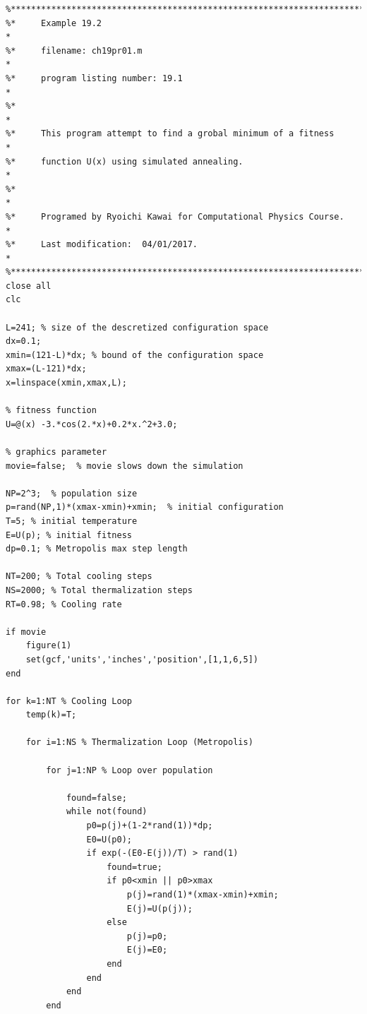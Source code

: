\noindent
\program
\label{prog:sa}
\footnotesize
\begin{verbatim}
%**************************************************************************
%*     Example 19.2                                                       *
%*     filename: ch19pr01.m                                               *
%*     program listing number: 19.1                                       *
%*                                                                        *
%*     This program attempt to find a grobal minimum of a fitness         *
%*     function U(x) using simulated annealing.                                         *
%*                                                                        *
%*     Programed by Ryoichi Kawai for Computational Physics Course.       *
%*     Last modification:  04/01/2017.                                    *
%**************************************************************************
close all
clc

L=241; % size of the descretized configuration space
dx=0.1;
xmin=(121-L)*dx; % bound of the configuration space
xmax=(L-121)*dx;
x=linspace(xmin,xmax,L);

% fitness function
U=@(x) -3.*cos(2.*x)+0.2*x.^2+3.0;

% graphics parameter
movie=false;  % movie slows down the simulation

NP=2^3;  % population size
p=rand(NP,1)*(xmax-xmin)+xmin;  % initial configuration
T=5; % initial temperature
E=U(p); % initial fitness
dp=0.1; % Metropolis max step length

NT=200; % Total cooling steps
NS=2000; % Total thermalization steps
RT=0.98; % Cooling rate

if movie
    figure(1)
    set(gcf,'units','inches','position',[1,1,6,5])
end

for k=1:NT % Cooling Loop
    temp(k)=T;

    for i=1:NS % Thermalization Loop (Metropolis)
        
        for j=1:NP % Loop over population

            found=false;
            while not(found)
                p0=p(j)+(1-2*rand(1))*dp;
                E0=U(p0);
                if exp(-(E0-E(j))/T) > rand(1)
                    found=true;
                    if p0<xmin || p0>xmax
                        p(j)=rand(1)*(xmax-xmin)+xmin;
                        E(j)=U(p(j));
                    else
                        p(j)=p0;
                        E(j)=E0;
                    end
                end
            end
        end


\end{verbatim}
